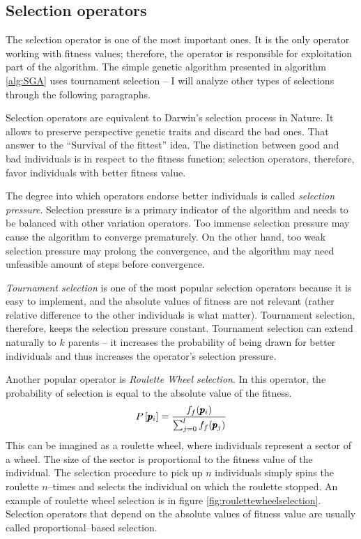 \subsection{Selection operators}

The selection operator is one of the most important ones. It is the only operator working with fitness values; therefore, the operator is responsible for exploitation part of the algorithm. The simple genetic algorithm presented in algorithm \ref{alg:SGA} uses tournament selection -- I will analyze other types of selections through the following paragraphs.

Selection operators are equivalent to Darwin's selection process in Nature. It allows to preserve perspective genetic traits and discard the bad ones. That answer to the \enquote{Survival of the fittest} idea. The distinction between good and bad individuals is in respect to the fitness function; selection operators, therefore, favor individuals with better fitness value.

The degree into which operators endorse better individuals is called \emph{selection pressure}. Selection pressure is a primary indicator of the algorithm and needs to be balanced with other variation operators. Too immense selection pressure may cause the algorithm to converge prematurely. On the other hand, too weak selection pressure may prolong the convergence, and the algorithm may need unfeasible amount of steps before convergence.

\emph{Tournament selection} is one of the most popular selection operators because it is easy to implement, and the absolute values of fitness are not relevant (rather relative difference to the other individuals is what matter). Tournament selection, therefore, keeps the selection pressure constant. Tournament selection can extend naturally to $k$ parents -- it increases the probability of being drawn for better individuals and thus increases the operator's selection pressure.

Another popular operator is \emph{Roulette Wheel selection}. In this operator, the probability of selection is equal to the absolute value of the fitness.
$$ P\left[\pmb{p}_i\right] = \frac{f_f(\pmb{p}_i)}{\sum_{j=0}^{l}f_f(\pmb{p}_j)} $$
This can be imagined as a roulette wheel, where individuals represent a sector of a wheel. The size of the sector is proportional to the fitness value of the individual. The selection procedure to pick up $n$ individuals simply spins the roulette $n$--times and selects the individual on which the roulette stopped. An example of roulette wheel selection is in figure \ref{fig:roulettewheelselection}. Selection operators that depend on the absolute values of fitness value are usually called proportional--based selection.

